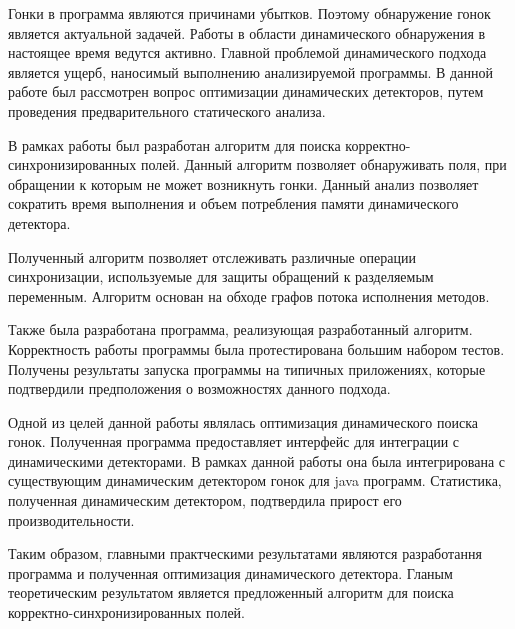 \startconclusionpage

Гонки в программа являются причинами убытков. Поэтому обнаружение гонок является актуальной задачей. Работы в области динамического обнаружения в настоящее время ведутся активно.  Главной проблемой динамического подхода является ущерб, наносимый выполнению анализируемой программы. 
В данной работе был рассмотрен вопрос оптимизации динамических детекторов, путем проведения предварительного  статического анализа.

В рамках работы был разработан алгоритм для поиска корректно-синхронизированных полей. Данный алгоритм позволяет обнаруживать поля, при обращении к которым не может возникнуть гонки. Данный анализ позволяет сократить время выполнения и объем потребления памяти динамического детектора.

Полученный алгоритм позволяет отслеживать различные операции синхронизации, используемые для защиты обращений к разделяемым переменным. Алгоритм основан на обходе графов потока исполнения методов. 

Также была разработана программа, реализующая разработанный алгоритм. 
Корректность работы программы была протестирована большим набором тестов. Получены результаты запуска программы на типичных приложениях, которые подтвердили предположения о возможностях данного подхода.

Одной из целей данной работы являлась оптимизация динамического поиска гонок. Полученная программа предоставляет интерфейс для интеграции с динамическими детекторами. В рамках данной работы она была интегрирована с существующим динамическим детектором гонок для java программ. Статистика, полученная динамическим детектором, подтвердила 
прирост его производительности.  

Таким образом, главными практческими результатами являются разработання программа и полученная оптимизация динамического детектора. Гланым теоретическим результатом является предложенный алгоритм для поиска корректно-синхронизированных полей. 

\FloatBarrier
